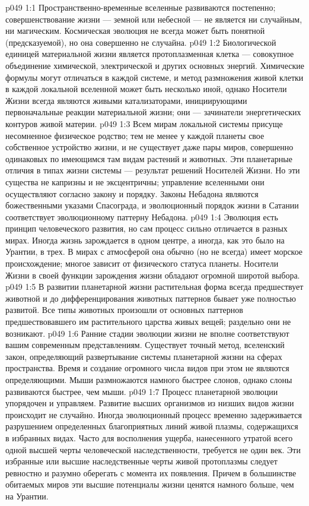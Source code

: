 \vs p049 1:1 Пространственно\hyp{}временные вселенные развиваются постепенно; совершенствование жизни --- земной или небесной --- не является ни случайным, ни магическим. Космическая эволюция не всегда может быть понятной (предсказуемой), но она совершенно не случайна.
\vs p049 1:2 Биологической единицей материальной жизни является протоплазменная клетка --- совокупное объединение химической, электрической и других основных энергий. Химические формулы могут отличаться в каждой системе, и метод размножения живой клетки в каждой локальной вселенной может быть несколько иной, однако Носители Жизни всегда являются живыми катализаторами, инициирующими первоначальные реакции материальной жизни; они --- зачинатели энергетических контуров живой материи.
\vs p049 1:3 Всем мирам локальной системы присуще несомненное физическое родство; тем не менее у каждой планеты свое собственное устройство жизни, и не существует даже пары миров, совершенно одинаковых по имеющимся там видам растений и животных. Эти планетарные отличия в типах жизни системы --- результат решений Носителей Жизни. Но эти существа не капризны и не эксцентричны; управление вселенными они осуществляют согласно закону и порядку. Законы Небадона являются божественными указами Спасограда, и эволюционный порядок жизни в Сатании соответствует эволюционному паттерну Небадона.
\vs p049 1:4 Эволюция есть принцип человеческого развития, но сам процесс сильно отличается в разных мирах. Иногда жизнь зарождается в одном центре, а иногда, как это было на Урантии, в трех. В мирах с атмосферой она обычно (но не всегда) имеет морское происхождение; многое зависит от физического статуса планеты. Носители Жизни в своей функции зарождения жизни обладают огромной широтой выбора.
\vs p049 1:5 В развитии планетарной жизни растительная форма всегда предшествует животной и до дифференцирования животных паттернов бывает уже полностью развитой. Все типы животных произошли от основных паттернов предшествовавшего им растительного царства живых вещей; раздельно они не возникают.
\vs p049 1:6 Ранние стадии эволюции жизни не вполне соответствуют вашим современным представлениям.  Существует точный метод, вселенский закон, определяющий развертывание системы планетарной жизни на сферах пространства. Время и создание огромного числа видов при этом не являются определяющими. Мыши размножаются намного быстрее слонов, однако слоны развиваются быстрее, чем мыши.
\vs p049 1:7 Процесс планетарной эволюции упорядочен и управляем. Развитие высших организмов из низших видов жизни происходит не случайно. Иногда эволюционный процесс временно задерживается разрушением определенных благоприятных линий живой плазмы, содержащихся в избранных видах. Часто для восполнения ущерба, нанесенного утратой всего одной высшей черты человеческой наследственности, требуется не один век. Эти избранные или высшие наследственные черты живой протоплазмы следует ревностно и разумно оберегать с момента их появления. Причем в большинстве обитаемых миров эти высшие потенциалы жизни ценятся намного больше, чем на Урантии.
